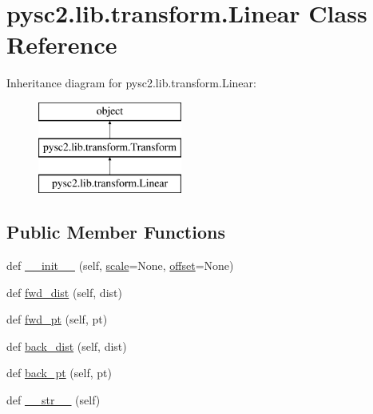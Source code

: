 \hypertarget{classpysc2_1_1lib_1_1transform_1_1_linear}{}\section{pysc2.\+lib.\+transform.\+Linear Class Reference}
\label{classpysc2_1_1lib_1_1transform_1_1_linear}
Inheritance diagram for pysc2.\+lib.\+transform.\+Linear\+:\begin{figure}[H]
\begin{center}
\leavevmode
\includegraphics[height=3.000000cm]{classpysc2_1_1lib_1_1transform_1_1_linear}
\end{center}
\end{figure}
\subsection*{Public Member Functions}
\begin{DoxyCompactItemize}
\item 
def \mbox{\hyperlink{classpysc2_1_1lib_1_1transform_1_1_linear_a06a44d88ea3290ac1e9322188bfe3467}{\+\_\+\+\_\+init\+\_\+\+\_\+}} (self, \mbox{\hyperlink{classpysc2_1_1lib_1_1transform_1_1_linear_ab3878c47278f90e9b5356776e73b517b}{scale}}=None, \mbox{\hyperlink{classpysc2_1_1lib_1_1transform_1_1_linear_a01c3b2d7fafe75ff24327c57e3a684c9}{offset}}=None)
\item 
def \mbox{\hyperlink{classpysc2_1_1lib_1_1transform_1_1_linear_aa540ebc88fcfb5e61bc2516ed5ca3077}{fwd\+\_\+dist}} (self, dist)
\item 
def \mbox{\hyperlink{classpysc2_1_1lib_1_1transform_1_1_linear_ab5b6ab1a2dbfcdbe72e7476d0e6c71e5}{fwd\+\_\+pt}} (self, pt)
\item 
def \mbox{\hyperlink{classpysc2_1_1lib_1_1transform_1_1_linear_a20b03bc9984ab9b5bffb93a157a448d1}{back\+\_\+dist}} (self, dist)
\item 
def \mbox{\hyperlink{classpysc2_1_1lib_1_1transform_1_1_linear_aab8bccdffa1f68f095af071b7cab7471}{back\+\_\+pt}} (self, pt)
\item 
def \mbox{\hyperlink{classpysc2_1_1lib_1_1transform_1_1_linear_a9c94d0303ddc2067febe43ba4ed58192}{\+\_\+\+\_\+str\+\_\+\+\_\+}} (self)
\end{DoxyCompactItemize}
